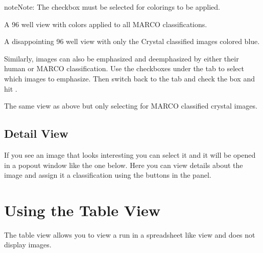 \documentclass[letterpaper,10pt,english]{sphinxmanual}
\begin{document}
\begin{sphinxadmonition}{note}{Note:}
The  checkbox must be selected for colorings to be applied.
\end{sphinxadmonition}

A 96 well view with colors applied to all MARCO classifications.
\begin{quote}

\noindent{}
\end{quote}

A disappointing 96 well view with only the Crystal classified images colored blue.
\begin{quote}

\noindent{}
\end{quote}

Similarly, images can also be emphasized and deemphasized by either their
human or MARCO classification. Use the checkboxes under the 
tab to select which images to emphasize. Then switch back to the  tab
and check the  box and hit .

The same view as above but only selecting for MARCO classified crystal images.
\begin{quote}

\noindent{}
\end{quote}


\subsection{Detail View}
\label{\detokenize{user_guide:detail-view}}
If you see an image that looks interesting you can select it and it will be
opened in a popout window like the one below. Here you can view details about
the image and assign it a classification using the buttons in the 
panel.
\begin{quote}

\noindent{}
\end{quote}


\section{Using the Table View}
\label{\detokenize{user_guide:using-the-table-view}}
The table view allows you to view a run in a spreadsheet like view and does
not display images.
\begin{quote}

\noindent{}
\end{quote}
\end{document}

